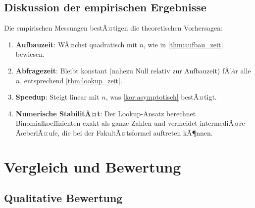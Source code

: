 ﻿\documentclass[12pt, a4paper]{article}
\theoremstyle{plain}
\theoremstyle{definition}
\theoremstyle{remark}
\begin{document}
\subsection{Diskussion der empirischen Ergebnisse}

Die empirischen Messungen bestÃ¤tigen die theoretischen Vorhersagen:
\begin{enumerate}
  \item \textbf{Aufbauzeit}: WÃ¤chst quadratisch mit $n$, wie in
        \cref{thm:aufbau_zeit} bewiesen.
  \item \textbf{Abfragezeit}: Bleibt konstant (nahezu Null relativ zur
        Aufbauzeit) fÃ¼r alle $n$, entsprechend \cref{thm:lookup_zeit}.
  \item \textbf{Speedup}: Steigt linear mit $n$, was \cref{kor:asymptotisch}
        bestÃ¤tigt.
  \item \textbf{Numerische StabilitÃ¤t}: Der Lookup-Ansatz berechnet
        Binomialkoeffizienten exakt als ganze Zahlen und vermeidet
        intermediÃ¤re ÃœberlÃ¤ufe, die bei der FakultÃ¤tsformel auftreten
        kÃ¶nnen.
\end{enumerate}


\section{Vergleich und Bewertung}
\label{sec:vergleich}

\subsection{Qualitative Bewertung}
\end{document}

